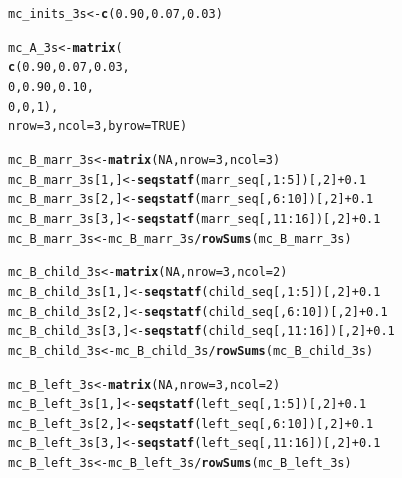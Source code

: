 \documentclass[12pt]{article}\usepackage[]{graphicx}\usepackage[]{color}
\makeatletter
\newcommand{\hlnum}[1]{\textcolor[rgb]{0.686,0.059,0.569}{#1}}%
\newcommand{\hlopt}[1]{\textcolor[rgb]{0,0,0}{#1}}%
\newcommand{\hlstd}[1]{\textcolor[rgb]{0.345,0.345,0.345}{#1}}%
\newcommand{\hlkwb}[1]{\textcolor[rgb]{0.69,0.353,0.396}{#1}}%
\newcommand{\hlkwc}[1]{\textcolor[rgb]{0.333,0.667,0.333}{#1}}%
\newcommand{\hlkwd}[1]{\textcolor[rgb]{0.737,0.353,0.396}{\textbf{#1}}}%
\newenvironment{kframe}{%
 \def\at@end@of@kframe{}%
 \ifinner\ifhmode%
  \def\at@end@of@kframe{\end{minipage}}%
  \begin{minipage}{\columnwidth}%
 \fi\fi%
 \def\FrameCommand##1{\hskip\@totalleftmargin \hskip-\fboxsep
 \colorbox{shadecolor}{##1}\hskip-\fboxsep
     \hskip-\linewidth \hskip-\@totalleftmargin \hskip\columnwidth}%
 \MakeFramed {\advance\hsize-\width
   \@totalleftmargin\z@ \linewidth\hsize
   \@setminipage}}%
 {\par\unskip\endMakeFramed%
 \at@end@of@kframe}
\newenvironment{knitrout}{}{} %
\makeatother
\begin{document}
\begin{knitrout}
\color{fgcolor}\begin{kframe}
\begin{alltt}
\hlstd{mc_inits_3s} \hlkwb{<-} \hlkwd{c}\hlstd{(}\hlnum{0.90}\hlstd{,} \hlnum{0.07}\hlstd{,} \hlnum{0.03}\hlstd{)}

\hlstd{mc_A_3s} \hlkwb{<-} \hlkwd{matrix}\hlstd{(}
  \hlkwd{c}\hlstd{(}\hlnum{0.90}\hlstd{,} \hlnum{0.07}\hlstd{,} \hlnum{0.03}\hlstd{,}
       \hlnum{0}\hlstd{,} \hlnum{0.90}\hlstd{,} \hlnum{0.10}\hlstd{,}
       \hlnum{0}\hlstd{,}    \hlnum{0}\hlstd{,}    \hlnum{1}\hlstd{),}
  \hlkwc{nrow} \hlstd{=} \hlnum{3}\hlstd{,} \hlkwc{ncol} \hlstd{=} \hlnum{3}\hlstd{,} \hlkwc{byrow} \hlstd{=} \hlnum{TRUE}\hlstd{)}

\hlstd{mc_B_marr_3s} \hlkwb{<-} \hlkwd{matrix}\hlstd{(}\hlnum{NA}\hlstd{,} \hlkwc{nrow}\hlstd{=}  \hlnum{3}\hlstd{,} \hlkwc{ncol} \hlstd{=} \hlnum{3}\hlstd{)}
\hlstd{mc_B_marr_3s[}\hlnum{1}\hlstd{,]} \hlkwb{<-} \hlkwd{seqstatf}\hlstd{(marr_seq[,} \hlnum{1}\hlopt{:}\hlnum{5}\hlstd{])[,} \hlnum{2}\hlstd{]} \hlopt{+} \hlnum{0.1}
\hlstd{mc_B_marr_3s[}\hlnum{2}\hlstd{,]} \hlkwb{<-} \hlkwd{seqstatf}\hlstd{(marr_seq[,} \hlnum{6}\hlopt{:}\hlnum{10}\hlstd{])[,} \hlnum{2}\hlstd{]} \hlopt{+} \hlnum{0.1}
\hlstd{mc_B_marr_3s[}\hlnum{3}\hlstd{,]} \hlkwb{<-} \hlkwd{seqstatf}\hlstd{(marr_seq[,} \hlnum{11}\hlopt{:}\hlnum{16}\hlstd{])[,} \hlnum{2}\hlstd{]} \hlopt{+} \hlnum{0.1}
\hlstd{mc_B_marr_3s} \hlkwb{<-} \hlstd{mc_B_marr_3s} \hlopt{/} \hlkwd{rowSums}\hlstd{(mc_B_marr_3s)}

\hlstd{mc_B_child_3s} \hlkwb{<-} \hlkwd{matrix}\hlstd{(}\hlnum{NA}\hlstd{,} \hlkwc{nrow} \hlstd{=} \hlnum{3}\hlstd{,} \hlkwc{ncol} \hlstd{=} \hlnum{2}\hlstd{)}
\hlstd{mc_B_child_3s[}\hlnum{1}\hlstd{,]} \hlkwb{<-} \hlkwd{seqstatf}\hlstd{(child_seq[,} \hlnum{1}\hlopt{:}\hlnum{5}\hlstd{])[,} \hlnum{2}\hlstd{]} \hlopt{+} \hlnum{0.1}
\hlstd{mc_B_child_3s[}\hlnum{2}\hlstd{,]} \hlkwb{<-} \hlkwd{seqstatf}\hlstd{(child_seq[,} \hlnum{6}\hlopt{:}\hlnum{10}\hlstd{])[,} \hlnum{2}\hlstd{]} \hlopt{+} \hlnum{0.1}
\hlstd{mc_B_child_3s[}\hlnum{3}\hlstd{,]} \hlkwb{<-} \hlkwd{seqstatf}\hlstd{(child_seq[,} \hlnum{11}\hlopt{:}\hlnum{16}\hlstd{])[,} \hlnum{2}\hlstd{]} \hlopt{+} \hlnum{0.1}
\hlstd{mc_B_child_3s} \hlkwb{<-} \hlstd{mc_B_child_3s} \hlopt{/} \hlkwd{rowSums}\hlstd{(mc_B_child_3s)}

\hlstd{mc_B_left_3s} \hlkwb{<-} \hlkwd{matrix}\hlstd{(}\hlnum{NA}\hlstd{,} \hlkwc{nrow} \hlstd{=} \hlnum{3}\hlstd{,} \hlkwc{ncol} \hlstd{=} \hlnum{2}\hlstd{)}
\hlstd{mc_B_left_3s[}\hlnum{1}\hlstd{,]} \hlkwb{<-} \hlkwd{seqstatf}\hlstd{(left_seq[,} \hlnum{1}\hlopt{:}\hlnum{5}\hlstd{])[,} \hlnum{2}\hlstd{]} \hlopt{+} \hlnum{0.1}
\hlstd{mc_B_left_3s[}\hlnum{2}\hlstd{,]} \hlkwb{<-} \hlkwd{seqstatf}\hlstd{(left_seq[,} \hlnum{6}\hlopt{:}\hlnum{10}\hlstd{])[,} \hlnum{2}\hlstd{]} \hlopt{+} \hlnum{0.1}
\hlstd{mc_B_left_3s[}\hlnum{3}\hlstd{,]} \hlkwb{<-} \hlkwd{seqstatf}\hlstd{(left_seq[,} \hlnum{11}\hlopt{:}\hlnum{16}\hlstd{])[,} \hlnum{2}\hlstd{]} \hlopt{+} \hlnum{0.1}
\hlstd{mc_B_left_3s} \hlkwb{<-} \hlstd{mc_B_left_3s} \hlopt{/} \hlkwd{rowSums}\hlstd{(mc_B_left_3s)}


\end{alltt}
\end{kframe}
\end{knitrout}
\end{document}
